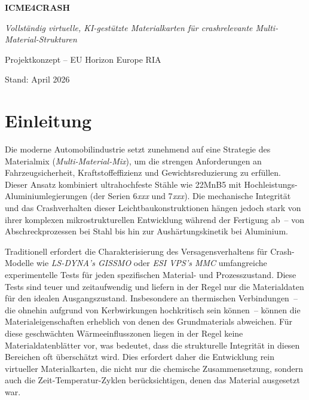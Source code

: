 \documentclass[12pt,a4paper]{article}
\begin{document}
\begin{titlepage}
    \centering
    \vspace*{2cm}
    {\Huge\bfseries ICME4CRASH\par}
    \vspace{0.5cm}
    {\large\itshape Vollständig virtuelle, KI-gestützte Materialkarten für
    crashrelevante Multi-Material-Strukturen\par}
    \vspace{1.5cm}
    {\large Projektkonzept -- EU Horizon Europe RIA\par}
    \vfill
    {\normalsize Stand: April 2026}
\end{titlepage}

\tableofcontents
\clearpage

\section{Einleitung}

Die moderne Automobilindustrie setzt zunehmend auf eine Strategie des
Materialmix (\emph{Multi-Material-Mix}), um die strengen Anforderungen an
Fahrzeugsicherheit, Kraftstoffeffizienz und Gewichtsreduzierung zu erfüllen.
Dieser Ansatz kombiniert ultrahochfeste Stähle wie 22MnB5 mit
Hochleistungs-Aluminiumlegierungen (der Serien 6\textit{xxx} und
7\textit{xxx}). Die mechanische Integrität und das Crashverhalten dieser
Leichtbaukonstruktionen hängen jedoch stark von ihrer komplexen
mikrostrukturellen Entwicklung während der Fertigung ab~-- von
Abschreckprozessen bei Stahl bis hin zur Aushärtungskinetik bei Aluminium.

Traditionell erfordert die Charakterisierung des Versagensverhaltens für
Crash-Modelle wie \emph{LS-DYNA's GISSMO} oder \emph{ESI VPS's MMC}
umfangreiche experimentelle Tests für jeden spezifischen Material- und
Prozesszustand. Diese Tests sind teuer und zeitaufwendig und liefern in der
Regel nur die Materialdaten für den idealen Ausgangszustand. Insbesondere an
thermischen Verbindungen~-- die ohnehin aufgrund von Kerbwirkungen
hochkritisch sein können~-- können die Materialeigenschaften erheblich von
denen des Grundmaterials abweichen. Für diese geschwächten
Wärmeeinflusszonen liegen in der Regel keine Materialdatenblätter vor, was
bedeutet, dass die strukturelle Integrität in diesen Bereichen oft
überschätzt wird. Dies erfordert daher die Entwicklung rein virtueller
Materialkarten, die nicht nur die chemische Zusammensetzung, sondern auch
die Zeit-Temperatur-Zyklen berücksichtigen, denen das Material ausgesetzt
war.
\end{document}
